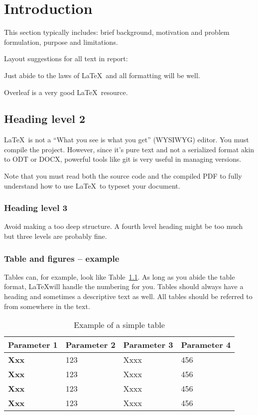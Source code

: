 \chapter{Introduction}
This section typically includes: brief background, motivation and
problem formulation, purpose and limitations.

Layout suggestions for all text in report:

Just abide to the laws of \LaTeX\, and all formatting will be well.

Overleaf is a very good \LaTeX\, resource.

\section{Heading level 2}
\LaTeX\, is not a ``What you see is what you get'' (WYSIWYG)
editor. You must compile the project. However, since it's pure text
and not a serialized format akin to ODT or DOCX, powerful tools
like git is very useful in managing versions. 

Note that you must read both the source code and the compiled PDF
to fully understand how to use \LaTeX\, to typeset your document.

\subsection{Heading level 3}
Avoid making a too deep structure. A fourth level heading might be
too much but three levels are probably fine.

\subsection{Table and figures -- example}

Tables can, for example, look like Table~\ref{tab:example}. As long
as you abide the table format, \LaTeX will handle the numbering for
you. Tables should always have a heading and sometimes a
descriptive text as well. All tables should be referred to from
somewhere in the text.

\begin{table}[ht!]
    \centering
    \caption{Example of a simple table}
    \label{tab:example}
    \begin{tabular}{|l|l|l|l|}
        \hline
        \textbf{Parameter 1} & \textbf{Parameter 2} & \textbf{Parameter 3} & \textbf{Parameter 4}\\
        \hline
        \textbf{Xxx} & 123 & Xxxx & 456 \\
        \hline
        \textbf{Xxx} & 123 & Xxxx & 456 \\
        \hline
        \textbf{Xxx} & 123 & Xxxx & 456 \\
        \hline
        \textbf{Xxx} & 123 & Xxxx & 456 \\
        \hline
    \end{tabular}
\end{table}

